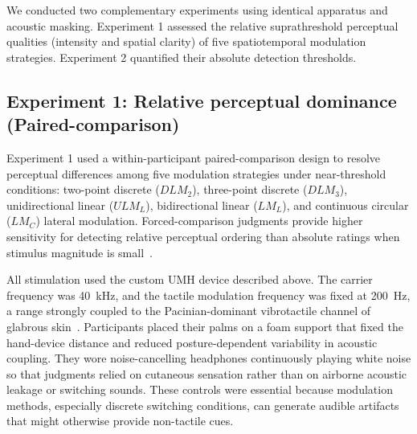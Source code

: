 \documentclass[pdflatex, sn-nature]{sn-jnl}
\theoremstyle{thmstyleone}%
\theoremstyle{thmstyletwo}%
\theoremstyle{thmstylethree}%
\begin{document}
We conducted two complementary experiments using identical apparatus and acoustic masking. Experiment 1 assessed the relative suprathreshold perceptual qualities (intensity and spatial clarity) of five spatiotemporal modulation strategies. Experiment 2 quantified their absolute detection thresholds.

\subsection*{Experiment 1: Relative perceptual dominance (Paired-comparison)}
\label{sec:experiment_1_relative_perceptual_dominance}

Experiment 1 used a within-participant paired-comparison design to resolve perceptual differences among five modulation strategies under near-threshold conditions: two-point discrete ($DLM_2$), three-point discrete ($DLM_3$), unidirectional linear ($ULM_L$), bidirectional linear ($LM_L$), and continuous circular ($LM_C$) lateral modulation. Forced-comparison judgments provide higher sensitivity for detecting relative perceptual ordering than absolute ratings when stimulus magnitude is small~\citep{bradleyRankAnalysisIncomplete1952, johnsonNeuralBasisHaptic2002}.

All stimulation used the custom UMH device described above. The carrier frequency was \qty{40}{\kilo\hertz}, and the tactile modulation frequency was fixed at \qty{200}{\hertz}, a range strongly coupled to the Pacinian-dominant vibrotactile channel of glabrous skin~\citep{mountcastleNeuralBasisSense1967, talbotSenseFluttervibrationComparison1968a, johnsonRolesFunctionsCutaneous2001, handlerMechanosensoryNeuronsTouch2021}. Participants placed their palms on a foam support that fixed the hand-device distance and reduced posture-dependent variability in acoustic coupling. They wore noise-cancelling headphones continuously playing white noise so that judgments relied on cutaneous sensation rather than on airborne acoustic leakage or switching sounds. These controls were essential because modulation methods, especially discrete switching conditions, can generate audible artifacts that might otherwise provide non-tactile cues.
\end{document}
